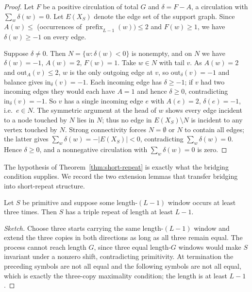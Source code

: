 \begin{proof}
Let $F$ be a positive circulation of total $G$ and $\delta=F-A$, a circulation
with $\sum_w\delta(w)=0$. Let $E(X_S)$ denote the edge set of the
support graph. Since $A(w)\le$ (occurrences of
$\operatorname{prefix}_{L-1}(w))\le 2$ and $F(w)\ge 1$, we have
$\delta(w)\ge-1$ on every edge.

Suppose $\delta\ne 0$. Then $N=\{w:\delta(w)<0\}$ is nonempty, and on $N$ we
have $\delta(w)=-1$, $A(w)=2$, $F(w)=1$. Take $w\in N$ with tail $v$. As
$A(w)=2$ and $\mathrm{out}_A(v)\le 2$, $w$ is the only outgoing edge at $v$, so
$\mathrm{out}_\delta(v)=-1$ and balance gives $\mathrm{in}_\delta(v)=-1$. Each
incoming edge has $\delta\ge-1$; if $v$ had two incoming edges they would each
have $A=1$ and hence $\delta\ge0$, contradicting $\mathrm{in}_\delta(v)=-1$. So
$v$ has a single incoming edge $e$ with $A(e)=2$, $\delta(e)=-1$, i.e.\ $e\in N$.
The symmetric argument at the head of $w$ shows every edge incident to a node
touched by $N$ lies in $N$; thus no edge in $E(X_S)\setminus N$ is incident to any
vertex touched by $N$. Strong connectivity forces $N=\emptyset$ or
$N$ to contain all edges; the latter gives $\sum_w\delta(w)=-|E(X_S)|<0$, contradicting
$\sum_w\delta(w)=0$. Hence $\delta\ge0$, and a nonnegative circulation with
$\sum_w\delta(w)=0$ is zero.
\end{proof}

The hypothesis of Theorem~\ref{thm:short-repeat} is exactly what the bridging
condition supplies. We record the two extension lemmas that transfer bridging
into short-repeat structure.

\begin{lemma}
\label{lem:primitive-extension}
Let $S$ be primitive and suppose some length-$(L-1)$ window occurs at least three
times. Then $S$ has a triple repeat of length at least $L-1$.
\end{lemma}

\begin{proof}[Sketch]
Choose three starts carrying the same length-$(L-1)$ window and extend the three
copies in both directions as long as all three remain equal. The process cannot
reach length $G$, since three equal length-$G$ windows would make $S$ invariant
under a nonzero shift, contradicting primitivity. At termination the preceding
symbols are not all equal and the following symbols are not all equal, which is
exactly the three-copy maximality condition; the length is at least $L-1$.
\end{proof}

